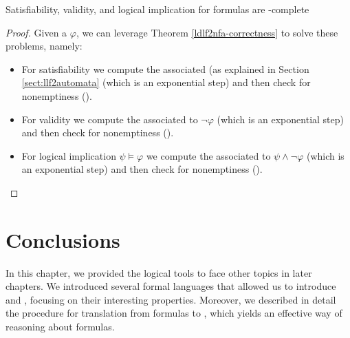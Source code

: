 \begin{theorem} Satisfiability, validity, and logical implication for \LDLf formulas are \PSPACE-complete
\end{theorem}
\begin{proof}
	Given a \LLf $\varphi$, we can leverage Theorem \ref{ldlf2nfa-correctness} to solve these problems, namely:
	\begin{itemize}
		\item For \LLf satisfiability we compute the associated \NFA (as explained in Section \ref{sect:llf2automata} (which is an exponential step) and then check \NFA for nonemptiness (\NLOGSPACE).
		\item For \LLf validity we compute the \NFA associated to $\lnot \varphi$ (which is an exponential step) and then check \NFA for nonemptiness (\NLOGSPACE).
		\item For \LLf logical implication $\psi \models \varphi$ we compute the \NFA associated to $\psi \wedge \lnot \varphi$ (which is an exponential step) and then check \NFA for nonemptiness (\NLOGSPACE).
	\end{itemize}
\end{proof}


\section{Conclusions}
In this chapter, we provided the logical tools to face other topics in later chapters. We introduced several formal languages that allowed us to introduce \LTLf and \LDLf, focusing on their interesting properties. Moreover, we described in detail the procedure for translation from \LLf formulas to \DFAs, which yields an effective way of reasoning about \LLf formulas.
